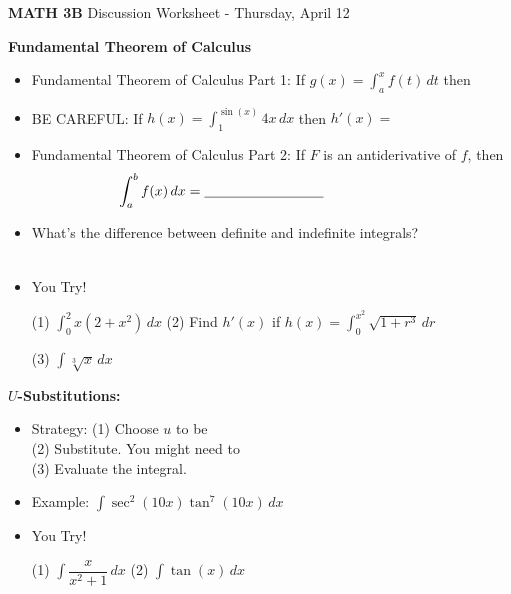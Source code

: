 \documentclass[12pt]{report}
\newcommand{\ds}{\displaystyle}
\begin{document}
\begin{center}
\textbf{{\LARGE MATH 3B}  \hfill} Discussion Worksheet - Thursday, April 12\\

\end{center}


\noindent\textbf{Fundamental Theorem of Calculus}

\begin{itemize}

\item Fundamental Theorem of Calculus Part 1: If $g(x) = \ds \int_{a}^x f(t) \, dt$ then \hrulefill %

\item BE CAREFUL: If $\ds h(x) = \int^{\sin(x)}_1 4x \, dx $ then $h'(x) = $ \underline{\hspace{3cm}}

\item Fundamental Theorem of Calculus Part 2: If $F$ is an antiderivative of $f$, then $$\hspace{-1in}\ds \int_a^b f(x) \, dx = \text{\underline{\hspace{3cm}}}$$%

\item What's the difference between definite and indefinite integrals? \hrulefill 
\\ \mbox{} \hrulefill
\\ \mbox{} \hrulefill

\item You Try!

(1) $\ds \int_0^2 x(2 + x^2) \, dx$ \hspace{1.5in} (2) Find $h'(x)$ if $h(x) = \ds \int_0^{x^2} \sqrt{1+r^3} \, dr$

\vspace{1in}

(3) $\ds\int \sqrt[3]{x} \, dx$

\end{itemize}


\noindent\textbf{$U$-Substitutions:}

\begin{itemize}

\item Strategy: (1) Choose $u$ to be \hrulefill \\
(2) Substitute. You might need to \hrulefill \\
(3) Evaluate the integral.

\item Example: $\ds \int \sec^2(10x)\tan^7(10x) \, dx$

\bigskip\bigskip\bigskip

\item You Try!

(1) $\ds \int \dfrac{x}{x^2 + 1} \, dx$ \hspace{2in} (2) $\ds\int \tan(x) \, dx$

\bigskip\bigskip\bigskip


\end{itemize}
\end{document}
